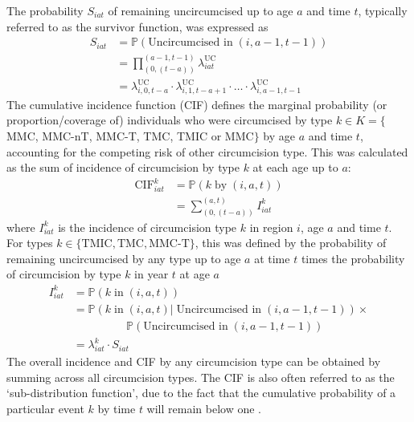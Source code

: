 \documentclass{article}
\begin{document}
\begin{appendix}
The probability $S_{iat}$ of remaining uncircumcised up to age $a$ and time $t$,  typically referred to as the survivor function, was expressed as
\begin{equation}
	\begin{split}
		S_{iat} &= \mathbb{P}(\text{Uncircumcised in} \; (i,a-1,t-1)) \\
				&= \prod_{(0,(t-a))}^{(a-1,t-1)}\lambda^{\text{UC}}_{iat} \\
				&= \lambda^{\text{UC}}_{i,0,t-a}\cdot \lambda^{\text{UC}}_{i,1,t-a+1}\cdot\ldots \cdot\lambda^{\text{UC}}_{i,a-1,t-1}
	\end{split}
	\label{eqn::survfunc}
\end{equation}
The cumulative incidence function (CIF) defines the marginal probability (or proportion/coverage of) individuals who were circumcised by type $k\in K = \{$ MMC, MMC-nT, MMC-T, TMC, TMIC or MMC$\}$ by age $a$ and time $t$, accounting for the competing risk of other circumcision type. This was calculated as the sum of incidence of circumcision by type $k$ at each age up to $a$:
\begin{equation}
	\begin{split}
		\text{CIF}_{iat}^k &= \mathbb{P}(k \; \text{by} \; (i,a,t)) \\
		&= \sum_{(0,(t-a))}^{(a,t)} I^k_{iat}
	\end{split}
	\label{eqn::cuminc}
\end{equation}
where $I^k_{iat}$ is the incidence of circumcision type $k$ in region $i$, age $a$ and time $t$. For types $k \in \{\textrm{TMIC}, \textrm{TMC}, \textrm{MMC-T}\}$, this was defined by the probability of remaining uncircumcised by any type up to age $a$ at time $t$ times the probability of circumcision by type $k$ in year $t$ at age $a$
\begin{equation}
	\begin{split}
		I_{iat}^k &= \mathbb{P}(k \; \text{in} \; (i,a,t)) \\
		       &= \mathbb{P}(k \; \text{in} \; (i,a,t) | \; \text{Uncircumcised in} \; (i,a-1,t-1))\times \\
		       & \;\;\;\;\;\;\;\;\;\;\;\;\;\;\;\;\;\mathbb{P}(\text{Uncircumcised in} \; (i,a-1,t-1)) \\
	    	   &= \lambda_{iat}^k \cdot S_{iat} 
	\end{split}
	\label{eqn::inc}
\end{equation}
The overall incidence and CIF by any circumcision type can be obtained by summing across all circumcision types. The CIF is also often referred to as the `sub-distribution function', due to the fact that the cumulative probability of a particular event $k$ by time $t$ will remain below one \cite{putter2006tutorial}. 


\end{appendix}
\end{document}
